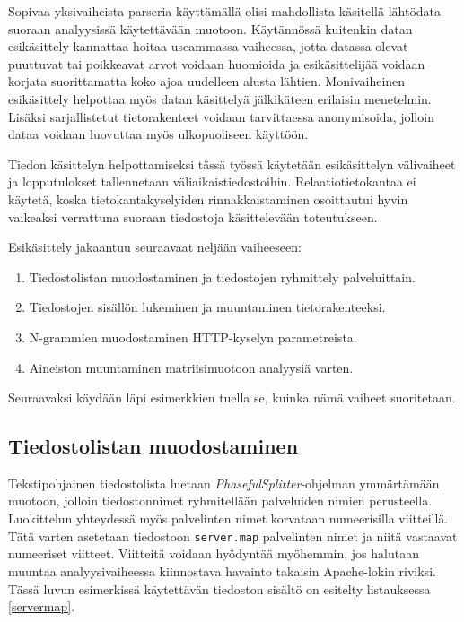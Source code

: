 Sopivaa yksivaiheista parseria käyttämällä olisi mahdollista käsitellä
lähtödata suoraan analyysissä käytettävään muotoon. Käytännössä
kuitenkin datan esikäsittely kannattaa hoitaa useammassa vaiheessa,
jotta datassa olevat puuttuvat tai poikkeavat arvot voidaan huomioida
ja esikäsittelijää voidaan korjata suorittamatta koko ajoa uudelleen
alusta lähtien. Monivaiheinen esikäsittely helpottaa myös datan
käsittelyä jälkikäteen erilaisin menetelmin. Lisäksi sarjallistetut
tietorakenteet voidaan tarvittaessa anonymisoida, jolloin dataa
voidaan luovuttaa myös ulkopuoliseen käyttöön.

Tiedon käsittelyn helpottamiseksi tässä työssä käytetään esikäsittelyn
välivaiheet ja lopputulokset tallennetaan väliaikaistiedostoihin.
Relaatiotietokantaa ei käytetä, koska tietokantakyselyiden
rinnakkaistaminen osoittautui hyvin vaikeaksi verrattuna suoraan
tiedostoja käsittelevään toteutukseen.

Esikäsittely jakaantuu seuraavaat neljään vaiheeseen:

\begin{enumerate}
\item Tiedostolistan muodostaminen ja tiedostojen ryhmittely palveluittain.
\item Tiedostojen sisällön lukeminen ja muuntaminen tietorakenteeksi.
\item N-grammien muodostaminen HTTP-kyselyn parametreista.
\item Aineiston muuntaminen matriisimuotoon analyysiä varten.
\end{enumerate}

Seuraavaksi käydään läpi esimerkkien tuella se, kuinka nämä vaiheet
suoritetaan.

\subsection{Tiedostolistan muodostaminen}

Tekstipohjainen tiedostolista luetaan
\textit{PhasefulSplitter}-ohjelman ymmärtämään muotoon, jolloin
tiedostonnimet ryhmitellään palveluiden nimien perusteella. 
Luokittelun yhteydessä myös palvelinten nimet korvataan numeerisilla
viitteillä. Tätä varten asetetaan tiedostoon \texttt{server.map}
palvelinten nimet ja niitä vastaavat numeeriset viitteet. Viitteitä
voidaan hyödyntää myöhemmin, jos halutaan muuntaa analyysivaiheessa
kiinnostava havainto takaisin Apache-lokin riviksi. Tässä luvun
esimerkissä käytettävän tiedoston sisältö on esitelty listauksessa
\ref{servermap}.

